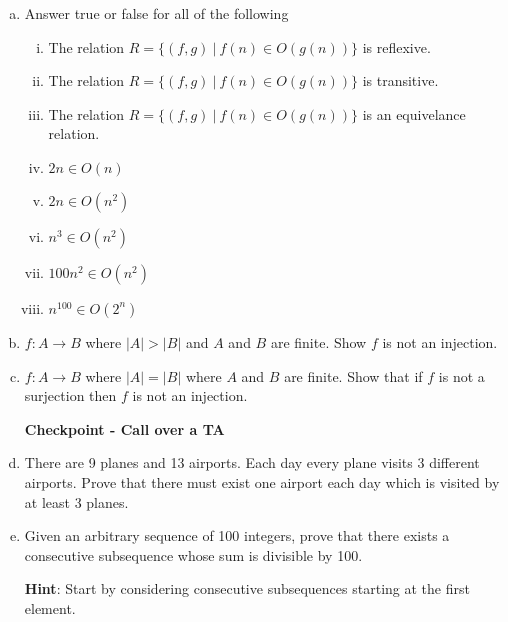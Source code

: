 \documentclass[12pt,letterpaper]{article}
\newcommand\hint[1]{\textbf{Hint}: #1}
\begin{document}
	\begin{enumerate}[a.]

		\item Answer true or false for all of the following
		\begin{enumerate}[i.]
			\item The relation $R = \{(f,g) \ | \ f(n) \in O(g(n))\}$ is reflexive.
			\item The relation $R = \{(f,g) \ | \ f(n) \in O(g(n))\}$  is transitive.
			\item The relation $R = \{(f,g) \ | \ f(n) \in O(g(n))\}$  is an equivelance relation.
			\item $2n \in O(n)$
			\item $2n \in O(n^2)$
			\item $n^3 \in O(n^2)$
			\item $100n^2 \in O(n^2)$
			\item $n^{100} \in O(2^n)$
	\end{enumerate}

		\pagebreak

		\item $f: A \rightarrow B$ where $|A| > |B|$ and $A$ and $B$ are finite. Show $f$ is not an injection.
		
		\begin{mdframed}
			\vspace{6cm}
		\end{mdframed}

		\item $f: A \rightarrow B$ where $|A| = |B|$ where $A$ and $B$ are finite. Show that if $f$ is not a surjection then $f$ is not an injection.
		
		\begin{mdframed}
			\vspace{6cm}
		\end{mdframed}

		\textbf{Checkpoint - Call over a TA}

		\pagebreak
	

		\item There are 9 planes and 13 airports. Each day every plane visits 3 different airports. Prove that there must exist one airport each day which is visited by at least 3 planes. 

		\begin{mdframed}
			\vspace{4cm}
		\end{mdframed}	

		\item Given an arbitrary sequence of 100 integers, prove that there exists a consecutive subsequence whose sum is divisible by 100.

		\hint Start by considering consecutive subsequences starting at the first element.

		\begin{mdframed}
			\vspace{12cm}
		\end{mdframed}

		
		
\end{enumerate}	
\end{document}
